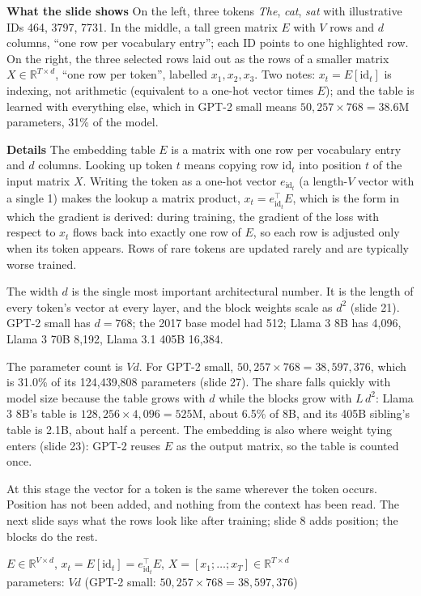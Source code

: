 \documentclass[11pt,letterpaper]{article}
\newcommand{\para}[1]{\medskip\noindent\textbf{#1}\quad}
\newenvironment{formulas}{\begin{tcolorbox}[formulabox]}{\end{tcolorbox}}
\begin{document}
\para{What the slide shows} On the left, three tokens \emph{The}, \emph{cat}, \emph{sat} with illustrative IDs 464, 3797, 7731. In the middle, a tall green matrix $E$ with $V$ rows and $d$ columns, ``one row per vocabulary entry''; each ID points to one highlighted row. On the right, the three selected rows laid out as the rows of a smaller matrix $X\in\mathbb{R}^{T\times d}$, ``one row per token'', labelled $x_1,x_2,x_3$. Two notes: $x_t=E[\mathrm{id}_t]$ is indexing, not arithmetic (equivalent to a one-hot vector times $E$); and the table is learned with everything else, which in GPT-2 small means $50{,}257\times768=38.6$M parameters, 31\% of the model.

\para{Details} The embedding table $E$ is a matrix with one row per vocabulary entry and $d$ columns. Looking up token $t$ means copying row $\mathrm{id}_t$ into position $t$ of the input matrix $X$. Writing the token as a one-hot vector $e_{\mathrm{id}_t}$ (a length-$V$ vector with a single 1) makes the lookup a matrix product, $x_t=e_{\mathrm{id}_t}^{\top}E$, which is the form in which the gradient is derived: during training, the gradient of the loss with respect to $x_t$ flows back into exactly one row of $E$, so each row is adjusted only when its token appears. Rows of rare tokens are updated rarely and are typically worse trained.

The width $d$ is the single most important architectural number. It is the length of every token's vector at every layer, and the block weights scale as $d^2$ (slide 21). GPT-2 small has $d=768$; the 2017 base model had 512; Llama 3 8B has 4,096, Llama 3 70B 8,192, Llama 3.1 405B 16,384.

The parameter count is $Vd$. For GPT-2 small, $50{,}257\times768=38{,}597{,}376$, which is 31.0\% of its 124,439,808 parameters (slide 27). The share falls quickly with model size because the table grows with $d$ while the blocks grow with $L\,d^2$: Llama 3 8B's table is $128{,}256\times4{,}096=525$M, about 6.5\% of 8B, and its 405B sibling's table is 2.1B, about half a percent. The embedding is also where weight tying enters (slide 23): GPT-2 reuses $E$ as the output matrix, so the table is counted once.

At this stage the vector for a token is the same wherever the token occurs. Position has not been added, and nothing from the context has been read. The next slide says what the rows look like after training; slide 8 adds position; the blocks do the rest.

\begin{formulas}
$E\in\mathbb{R}^{V\times d}$, \quad $x_t=E[\mathrm{id}_t]=e_{\mathrm{id}_t}^{\top}E$, \quad $X=[x_1;\dots;x_T]\in\mathbb{R}^{T\times d}$\\[3pt]
parameters: $Vd$ \quad (GPT-2 small: $50{,}257\times768=38{,}597{,}376$)
\end{formulas}
\end{document}
